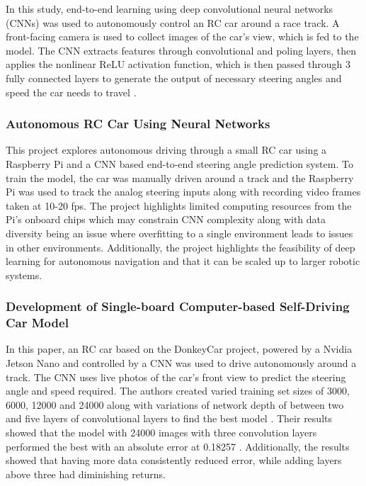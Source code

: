 \documentclass{article} %
\begin{document}
 
In this study, end-to-end learning using deep convolutional neural networks (CNNs) was used to autonomously control an RC car around a race track. 
A front-facing camera is used to collect images of the car’s view, which is fed to the model. The CNN extracts features through convolutional and poling layers, 
then applies the nonlinear ReLU activation function, which is then passed through 3 fully connected layers to generate the output of necessary steering angles 
and speed the car needs to travel \citep{bhutta2023deep}.

\subsubsection{Autonomous RC Car Using Neural Networks \citep{Mallik2023}}

This project explores autonomous driving through a small RC car using a Raspberry Pi and a CNN based end-to-end steering angle prediction system. 
To train the model, the car was manually driven around a track and the Raspberry Pi was used to track the analog steering inputs along with recording video frames 
taken at 10-20 fps. The project highlights limited computing resources from the Pi’s onboard chips which may constrain CNN complexity along with data 
diversity being an issue where overfitting to a single environment leads to issues in other environments. Additionally, the project highlights the 
feasibility of deep learning for autonomous navigation and that it can be scaled up to larger robotic systems.

\subsubsection{Development of Single-board Computer-based Self-Driving Car Model \citep{9751873}}

In this paper, an RC car based on the DonkeyCar project, powered by a Nvidia Jetson Nano and controlled by a CNN was used to drive autonomously around a track. The
CNN uses live photos of the car’s front view to predict the steering angle and speed required. The authors created varied training set sizes of 
3000, 6000, 12000 and 24000 along with variations of network depth of between two and five layers of convolutional layers to find the best model \citep{9751873}. 
Their results showed that the model with 24000 images with three convolution layers performed the best with an absolute error at 0.18257 \citep{9751873}. 
Additionally, the results showed that having more data consistently reduced error, while adding layers above three had diminishing returns. 
\end{document}
